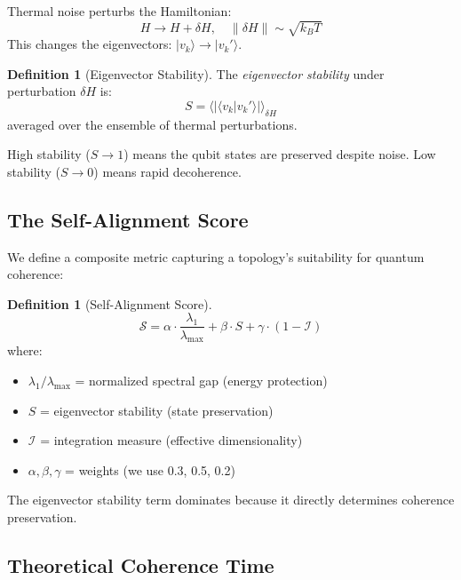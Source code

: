 \documentclass[11pt,a4paper]{article}
\theoremstyle{plain}
\theoremstyle{definition}
\newtheorem{definition}[theorem]{Definition}
\theoremstyle{remark}
\begin{document}
Thermal noise perturbs the Hamiltonian:
\begin{equation}
H \to H + \delta H, \quad \|\delta H\| \sim \sqrt{k_B T}
\end{equation}
This changes the eigenvectors: $|v_k\rangle \to |v_k'\rangle$.

\begin{definition}[Eigenvector Stability]
The \emph{eigenvector stability} under perturbation $\delta H$ is:
\begin{equation}
S = \langle |\langle v_k | v_k' \rangle| \rangle_{\delta H}
\end{equation}
averaged over the ensemble of thermal perturbations.
\end{definition}

High stability ($S \to 1$) means the qubit states are preserved despite noise. Low stability ($S \to 0$) means rapid decoherence.

\subsection{The Self-Alignment Score}

We define a composite metric capturing a topology's suitability for quantum coherence:

\begin{definition}[Self-Alignment Score]
\begin{equation}
\mathcal{S} = \alpha \cdot \frac{\lambda_1}{\lambda_{\max}} + \beta \cdot S + \gamma \cdot (1 - \mathcal{I})
\end{equation}
where:
\begin{itemize}
    \item $\lambda_1/\lambda_{\max}$ = normalized spectral gap (energy protection)
    \item $S$ = eigenvector stability (state preservation)
    \item $\mathcal{I}$ = integration measure (effective dimensionality)
    \item $\alpha, \beta, \gamma$ = weights (we use 0.3, 0.5, 0.2)
\end{itemize}
\end{definition}

The eigenvector stability term dominates because it directly determines coherence preservation.

\subsection{Theoretical Coherence Time}
\end{document}
